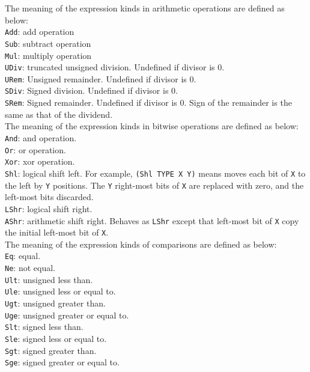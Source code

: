 The meaning of the expression kinds in arithmetic operations are defined as below:\\
\texttt{Add}: add operation\\
\texttt{Sub}: subtract operation\\
\texttt{Mul}: multiply operation\\
\texttt{UDiv}: truncated unsigned division. Undefined if divisor is 0.\\
\texttt{URem}: Unsigned remainder. Undefined if divisor is 0.\\
\texttt{SDiv}: Signed division. Undefined if divisor is 0.\\
\texttt{SRem}: Signed remainder. Undefined if divisor is 0. Sign of the remainder is the same as that of the dividend.\\

The meaning of the expression kinds in bitwise operations are defined as below:\\
\texttt{And}: and operation.\\
\texttt{Or}: or operation.\\
\texttt{Xor}: xor operation.\\
\texttt{Shl}: logical shift left. For example, \texttt{(Shl TYPE X Y)} means moves each bit of \texttt{X} to the left by \texttt{Y} positions. The \texttt{Y} right-most bits of \texttt{X} are replaced with zero, and the left-most bits discarded.\\
\texttt{LShr}: logical shift right.\\
\texttt{AShr}: arithmetic shift right. Behaves as \texttt{LShr} except that left-most bit of \texttt{X} copy the initial left-most bit of \texttt{X}.\\

The meaning of the expression kinds of comparisons are defined as below:\\
\texttt{Eq}: equal.\\
\texttt{Ne}: not equal.\\
\texttt{Ult}: unsigned less than.\\
\texttt{Ule}: unsigned less or equal to.\\
\texttt{Ugt}: unsigned greater than.\\
\texttt{Uge}: unsigned greater or equal to.\\
\texttt{Slt}: signed less than.\\
\texttt{Sle}: signed less or equal to.\\
\texttt{Sgt}: signed greater than.\\
\texttt{Sge}: signed greater or equal to.\\
